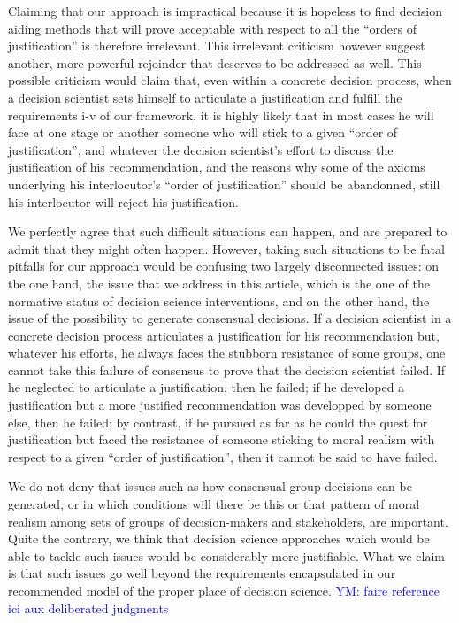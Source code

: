 \documentclass[preprint, french, english, 11pt]{elsarticle}%
\newcommand{\commentYM}[1]{\textcolor{blue}{YM: #1}}
\begin{document}
Claiming that our approach is impractical because it is hopeless to find decision aiding methods that will prove acceptable with respect to all the ``orders of justification'' is therefore irrelevant. This irrelevant criticism however suggest another, more powerful rejoinder that deserves to be addressed as well. This possible criticism would claim that, even within a concrete decision process, when a decision scientist sets himself to articulate a justification and fulfill the requirements i-v of our framework, it is highly likely that in most cases he will face at one stage or another someone who will stick to a given ``order of justification'', and whatever the decision scientist's effort to discuss the justification of his recommendation, and the reasons why some of the axioms underlying his interlocutor's ``order of justification'' should be abandonned, still his interlocutor will reject his justification.

We perfectly agree that such difficult situations can happen, and are prepared to admit that they might often happen. However, taking such situations to be fatal pitfalls for our approach would be confusing two largely disconnected issues: on the one hand, the issue that we address in this article, which is the one of the normative status of decision science interventions, and on the other hand, the issue of the possibility to generate consensual decisions. If a decision scientist in a concrete decision process articulates a justification for his recommendation but, whatever his efforts, he always faces the stubborn resistance of some groups, one cannot take this failure of consensus to prove that the decision scientist failed. If he neglected to articulate a justification, then he failed; if he developed a justification but a more justified recommendation was developped by someone else, then he failed; by contrast, if he pursued as far as he could the quest for justification but faced the resistance of someone sticking to moral realism with respect to a given ``order of justification'', then it cannot be said to have failed.

We do not deny that issues such as how consensual group decisions can be generated, or in which conditions will there be this or that pattern of moral realism among sets of groups of decision-makers and stakeholders, are important. Quite the contrary, we think that decision science approaches which would be able to tackle such issues would be considerably more justifiable. What we claim is that such issues go well beyond the requirements encapsulated in our recommended model of the proper place of decision science.
\commentYM{faire reference ici aux deliberated judgments}
\end{document}
